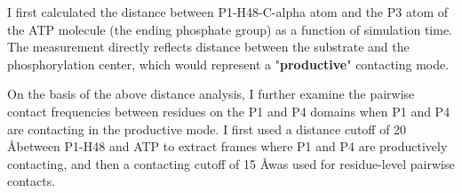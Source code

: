 \begin{description}[style=nextline,labelindent=0.5cm]
    \item[1. Distance analysis.] I first calculated the distance between P1-H48-C-alpha atom and the P3 atom of the ATP molecule (the ending phosphate group) as a function of simulation time. The measurement directly reflects distance between the substrate and the phosphorylation center, which would represent a "\textbf{productive}" contacting mode.

    \item[2. Contacting frequency analysis.] On the basis of the above distance analysis, I further examine the pairwise contact frequencies between residues on the P1 and P4 domains when P1 and P4 are contacting in the productive mode. I first used a distance cutoff of 20 \AA between P1-H48 and ATP to extract frames where P1 and P4 are productively contacting, and then a contacting cutoff of 15 \AA was used for residue-level pairwise contacts.
\end{description}
\newpage